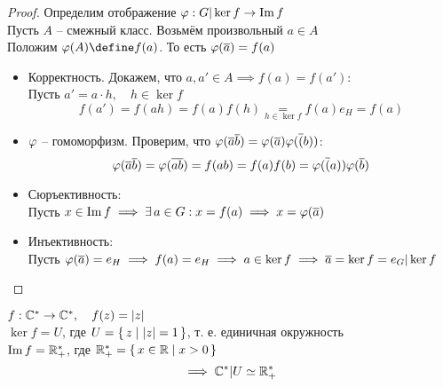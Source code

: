 \begin{proof}
	Определим отображение $ \varphi : G|\ker f \to \operatorname{Im} f $ \\
    Пусть $ A $ -- смежный класс. Возьмём произвольный $ a \in A $ \\
    Положим $ \vphi(A) \define f(a) $. То есть $ \varphi(\overline{a}) = f(a) $
    \begin{itemize}
    	\item Корректность. Докажем, что $ a, a' \in A \implies f(a) = f(a') $: \\
        Пусть $ a' = a \cdot h, \quad h \in \ker f $
        $$ f(a') = f(ah) = f(a)f(h) \underset{h \in \ker f}= f(a)e_H = f(a) $$
        \item $ \varphi $ -- гомоморфизм. Проверим, что $ \varphi(\overline{a}\overline{b}) = \varphi(\overline{a})\varphi(\overline(b)) $:
        $$ \varphi(\overline{a}\overline{b}) = \varphi(\overline{ab}) = f(ab) = f(a)f(b) = \varphi(\overline(a))\varphi(\overline{b}) $$
        \item Сюръективность: \\
        Пусть $ x \in \operatorname{Im} f \implies \exists\, a \in G : x = f(a) \implies x = \varphi(\overline{a}) $
        \item Инъективность: \\
        Пусть $ \varphi(\overline{a}) = e_H \implies f(a) = e_H \implies a \in \ker f \implies \overline{a} = \ker f = e_G|\ker f $
    \end{itemize}
\end{proof}

\begin{exmpls}
	\item $ f : \mathbb{C}^* \to \mathbb{C}^*, \quad f(z) = |z| $ \\
    $ \ker f = U $, где $ U = \set{z| |z| = 1} $, т. е. единичная окружность \\
    $ \operatorname{Im} f = \mathbb{R}_+^* $, где $ \mathbb{R}_+^* = \set{x \in \ensuremath{\mathbb{R}}| x > 0} $
    $$ \implies \mathbb{C}^* | U \simeq \mathbb{R}_+^* $$
\end{exmpls}
